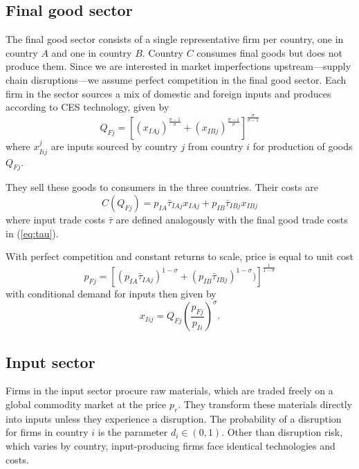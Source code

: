 \documentclass{article}
\begin{document}
\subsection{Final good sector}

The final good sector consists of a single representative firm per country, one in country $A$ and one in country $B$. Country $C$ consumes final goods but does not produce them. Since we are interested in market imperfections upstream---supply chain disruptions---we assume perfect competition in the final good sector. Each firm in the sector sources a mix of domestic and foreign inputs and produces according to CES technology, given by
\begin{equation}
    Q_{Fj} = \left[ \left( x_{IAj} \right)^\frac{\sigma-1}{\sigma} + \left( x_{IBj} \right)^\frac{\sigma-1}{\sigma} \right]^\frac{\sigma}{\sigma-1}
\end{equation}
where $x^j_{Iij}$ are inputs sourced by country $j$ from country $i$ for production of goods $Q_{Fj}$. 

They sell these goods to consumers in the three countries. Their costs are
\begin{equation}
    C(Q_{Fj}) = p_{IA} \bar{\tau}_{IAj} x_{IAj} + p_{IB} \bar{\tau}_{IBj} x_{IBj}
\end{equation}
where input trade costs $\bar{\tau}$ are defined analogously with the final good trade costs in (\ref{eq:tau}). 

With perfect competition and constant returns to scale, price is equal to unit cost
\begin{equation}
    p_{Fj} = \left[ ( p_{IA} \bar{\tau}_{IAj} )^{1 - \sigma} + ( p_{IB} \bar{\tau}_{IBj} )^{1 - \sigma}) \right]^{\frac{1}{1 - \sigma}}
\end{equation}
with conditional demand for inputs then given by
\begin{equation} \label{eq:input_demand}
    x_{Iij} = Q_{Fj} \left( \frac{p_{Fj}}{p_{Ii}} \right)^{\sigma}.
\end{equation}

\subsection{Input sector}

Firms in the input sector procure raw materials, which are traded freely on a global commodity market at the price $p_r$. They transform these materials directly into inputs unless they experience a disruption. The probability of a disruption for firms in country $i$ is the parameter $d_i \in (0, 1)$. Other than disruption risk, which varies by country, input-producing firms face identical technologies and costs.
\end{document}

